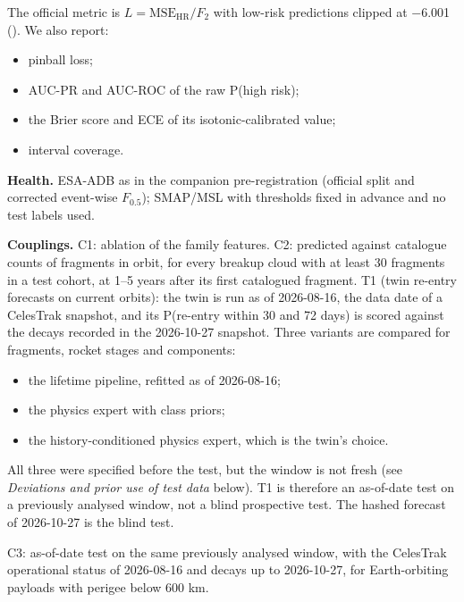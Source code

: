 \documentclass[
]{article}
\providecommand{\tightlist}{%
  \setlength{\itemsep}{0pt}\setlength{\parskip}{0pt}}
\begin{document}
The official metric is \(L = \text{MSE}_{\text{HR}}/F_2\) with low-risk
predictions clipped at −6.001 (). We also report:

\begin{itemize}
\tightlist
\item
  pinball loss;
\item
  AUC-PR and AUC-ROC of the raw P(high risk);
\item
  the Brier score and ECE of its isotonic-calibrated value;
\item
  interval coverage.
\end{itemize}

\textbf{Health.} ESA-ADB as in the companion pre-registration (official
split and corrected event-wise \(F_{0.5}\)); SMAP/MSL with thresholds
fixed in advance and no test labels used.

\textbf{Couplings.} C1: ablation of the family features. C2: predicted
against catalogue counts of fragments in orbit, for every breakup cloud
with at least 30 fragments in a test cohort, at 1--5 years after its
first catalogued fragment. T1 (twin re-entry forecasts on current
orbits): the twin is run as of 2026-08-16, the data date of a CelesTrak
snapshot, and its P(re-entry within 30 and 72 days) is scored against
the decays recorded in the 2026-10-27 snapshot. Three variants are
compared for fragments, rocket stages and components:

\begin{itemize}
\tightlist
\item
  the lifetime pipeline, refitted as of 2026-08-16;
\item
  the physics expert with class priors;
\item
  the history-conditioned physics expert, which is the twin's choice.
\end{itemize}

All three were specified before the test, but the window is not fresh
(see \emph{Deviations and prior use of test data} below). T1 is
therefore an as-of-date test on a previously analysed window, not a
blind prospective test. The hashed forecast of 2026-10-27 is the blind
test.

C3: as-of-date test on the same previously analysed window, with the
CelesTrak operational status of 2026-08-16 and decays up to 2026-10-27,
for Earth-orbiting payloads with perigee below 600 km.
\end{document}

